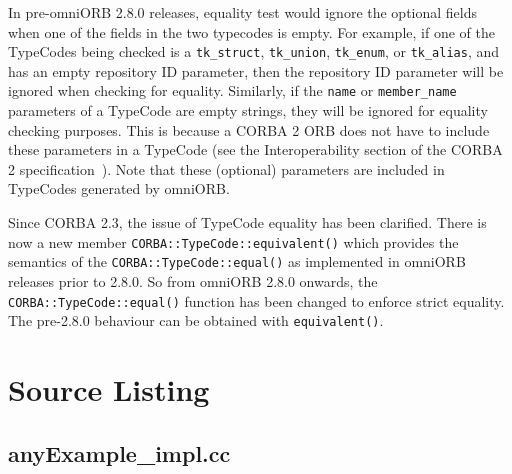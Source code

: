 \documentclass[11pt,twoside,a4paper]{book}
\newcommand{\code}[1]{\texttt{#1}}
\newcommand{\op}[1]{\texttt{#1()}}
\newcommand{\dsc}{\discretionary{}{}{}}
\begin{document}
In pre-omniORB 2.8.0 releases, equality test would ignore the optional
fields when one of the fields in the two typecodes is empty. For
example, if one of the TypeCodes being checked is a \code{tk\_struct},
\code{tk\_union}, \code{tk\_enum}, or \code{tk\_alias}, and has an
empty repository ID parameter, then the repository ID parameter will
be ignored when checking for equality.  Similarly, if the \code{name}
or \code{member\_name} parameters of a TypeCode are empty strings,
they will be ignored for equality checking purposes. This is because a
CORBA 2 ORB does not have to include these parameters in a TypeCode
(see the Interoperability section of the CORBA 2
specification~\cite{corba2-spec}). Note that these (optional)
parameters are included in TypeCodes generated by omniORB.

Since CORBA 2.3, the issue of TypeCode equality has been clarified.
There is now a new member \op{CORBA::TypeCode::equivalent} which
provides the semantics of the \op{CORBA::TypeCode::equal} as
implemented in omniORB releases prior to 2.8.0. So from omniORB 2.8.0
onwards, the \op{CORBA::TypeCode::\dsc{}equal} function has been
changed to enforce strict equality.  The pre-2.8.0 behaviour can be
obtained with \op{equivalent}.


\clearpage

\section{Source Listing}

\subsection{anyExample\_impl.cc}
\end{document}
